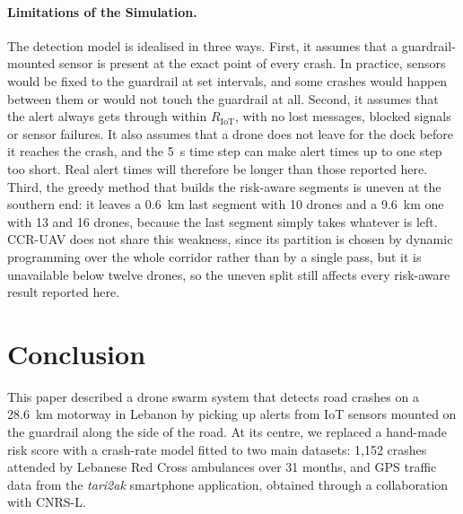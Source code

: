 \documentclass[11pt]{article}
\begin{document}
\paragraph{Limitations of the Simulation.}
The detection model is idealised in three ways. First, it assumes that a
guardrail-mounted sensor is present at the exact point of every crash. In
practice, sensors would be fixed to the guardrail at set intervals, and some
crashes would happen between them or would not touch the guardrail at all.
Second, it assumes that the alert always gets through within
$R_{\mathrm{IoT}}$, with no lost messages, blocked signals or sensor failures.
It also assumes that a drone does not leave for the dock before it reaches the
crash, and the 5~s time step can make alert times up to one step too short.
Real alert times will therefore be longer than those reported here. Third, the
greedy method that builds the risk-aware segments is uneven at the southern
end: it leaves a 0.6~km last segment with 10 drones and a 9.6~km one with 13
and 16 drones, because the last segment simply takes whatever is left.
CCR-UAV does not share this weakness, since its partition is chosen by
dynamic programming over the whole corridor rather than by a single pass,
but it is unavailable below twelve drones, so the uneven split still affects
every risk-aware result reported here.

\section{Conclusion}

This paper described a drone swarm system that detects road crashes on a
28.6~km motorway in Lebanon by picking up alerts from IoT sensors mounted on
the guardrail along the side of the road. At its centre, we replaced a
hand-made risk score with a crash-rate model fitted to two main datasets:
1{,}152 crashes attended by Lebanese Red Cross ambulances over 31 months, and
GPS traffic data from the \emph{tari2ak} smartphone application, obtained
through a collaboration with CNRS-L.
\end{document}
